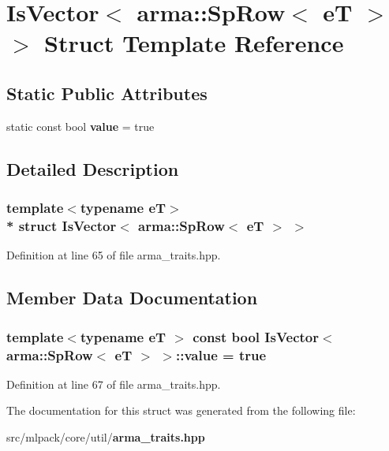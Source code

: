 \section{Is\+Vector$<$ arma\+:\+:Sp\+Row$<$ eT $>$ $>$ Struct Template Reference}
\label{structIsVector_3_01arma_1_1SpRow_3_01eT_01_4_01_4}
\subsection*{Static Public Attributes}
\begin{DoxyCompactItemize}
\item 
static const bool {\bf value} = true
\end{DoxyCompactItemize}


\subsection{Detailed Description}
\subsubsection*{template$<$typename eT$>$\\*
struct Is\+Vector$<$ arma\+::\+Sp\+Row$<$ e\+T $>$ $>$}



Definition at line 65 of file arma\+\_\+traits.\+hpp.



\subsection{Member Data Documentation}
\subsubsection[{value}]{\setlength{\rightskip}{0pt plus 5cm}template$<$typename eT $>$ const bool {\bf Is\+Vector}$<$ arma\+::\+Sp\+Row$<$ eT $>$ $>$\+::value = true\hspace{0.3cm}{\ttfamily [static]}}\label{structIsVector_3_01arma_1_1SpRow_3_01eT_01_4_01_4_ae34a53ab0f3ad0e317a28cee06e5c596}


Definition at line 67 of file arma\+\_\+traits.\+hpp.



The documentation for this struct was generated from the following file\+:\begin{DoxyCompactItemize}
\item 
src/mlpack/core/util/{\bf arma\+\_\+traits.\+hpp}\end{DoxyCompactItemize}
